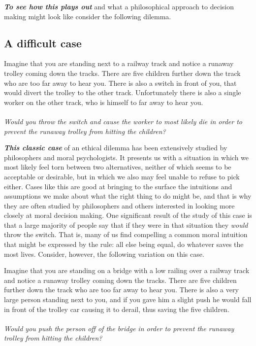 \documentclass[12pt, openany]{book}
\makeatletter
\newenvironment{kframe}{%
\medskip{}
\setlength{\fboxsep}{.8em}
 \def\at@end@of@kframe{}%
 \ifinner\ifhmode%
  \def\at@end@of@kframe{\end{minipage}}%
  \begin{minipage}{\columnwidth}%
 \fi\fi%
 \def\FrameCommand##1{\hskip\@totalleftmargin \hskip-\fboxsep
 \colorbox{shadecolor}{##1}\hskip-\fboxsep
     \hskip-\linewidth \hskip-\@totalleftmargin \hskip\columnwidth}%
 \MakeFramed {\advance\hsize-\width
   \@totalleftmargin\z@ \linewidth\hsize
   \@setminipage}}%
 {\par\unskip\endMakeFramed%
 \at@end@of@kframe}
\newenvironment{rmdblock}[1]
  {
  \begin{itemize}
  \renewcommand{\labelitemi}{
    \raisebox{-.7\height}[0pt][0pt]{
      {\setkeys{Gin}{width=3em,keepaspectratio}\texttt{[image: img/\#1]}}
    }
  }
  \setlength{\fboxsep}{1em}
  \begin{kframe}
  \item
  }
  {
  \end{kframe}
  \end{itemize}
  }
\newenvironment{rmdquestion}
  {\begin{rmdblock}{question}}
  {\end{rmdblock}}
\makeatother
\begin{document}
\textbf{\emph{To see how this plays out}} and what a philosophical approach to decision making might look like consider the following dilemma.

\hypertarget{a-difficult-case}{%
\subsection*{A difficult case}\label{a-difficult-case}}


\begin{rmdquestion}

Imagine that you are standing next to a railway track and notice a runaway trolley coming down the tracks. There are five children further down the track who are too far away to hear you. There is also a switch in front of you, that would divert the trolley to the other track. Unfortunately there is also a single worker on the other track, who is himself to far away to hear you.\\
~\\
\emph{Would you throw the switch and cause the worker to most likely die in order to prevent the runaway trolley from hitting the children?}

\end{rmdquestion}

\textbf{\emph{This classic case}} of an ethical dilemma has been extensively studied by philosophers and moral psychologists. It presents us with a situation in which we most likely feel torn between two alternatives, neither of which seems to be acceptable or desirable, but in which we also may feel unable to refuse to pick either. Cases like this are good at bringing to the surface the intuitions and assumptions we make about what the right thing to do might be, and that is why they are often studied by philosophers and others interested in looking more closely at moral decision making. One significant result of the study of this case is that a large majority of people say that if they were in that situation they \emph{would} throw the switch. That is, many of us find compelling a common moral intuition that might be expressed by the rule: all else being equal, do whatever saves the most lives. Consider, however, the following variation on this case.

\begin{rmdquestion}

Imagine that you are standing on a bridge with a low railing over a railway track and notice a runaway trolley coming down the tracks. There are five children further down the track who are too far away to hear you. There is also a very large person standing next to you, and if you gave him a slight push he would fall in front of the trolley car causing it to derail, thus saving the five children.\\
~\\
\emph{Would you push the person off of the bridge in order to prevent the runaway trolley from hitting the children?}

\end{rmdquestion}
\end{document}
